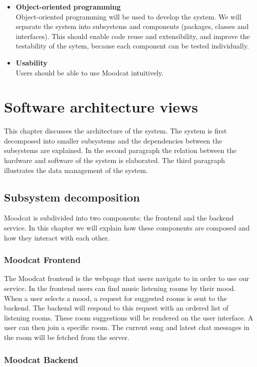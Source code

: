 \begin{itemize}
\item
\textbf{Object-oriented programming}
\\
Object-oriented programming\cite{Wirfs-Brock} will be used to develop the system.
We will separate the system into subsystems and components (packages, classes and interfaces).
This should enable code reuse and extensibility, and improve the testability of the sytem, because each component can be tested individually\cite{Binder}.

\item
\textbf{Usability}
\\
Users should be able to use Moodcat intuitively.

\end{itemize}

\chapter{Software architecture views}
This chapter discusses the architecture of the system.
The system is first decomposed into smaller subsystems and the dependencies between the subsystems are explained.
In the second paragraph the relation between the hardware and software of the system is elaborated.
The third paragraph illustrates the data management of the system.

\section{Subsystem decomposition}
Moodcat is subdivided into two components: the frontend and the backend service.
In this chapter we will explain how these components are composed and how they interact with each other.

\subsection{Moodcat Frontend}
The Moodcat frontend is the webpage that users navigate to in order to use our service.
In the frontend users can find music listening rooms by their mood.
When a user selects a mood, a request for suggested rooms is sent to the backend.
The backend will respond to this request with an ordered list of listening rooms.
These room suggestions will be rendered on the user interface.
A user can then join a specific room.
The current song and latest chat messages in the room will be fetched from the server.



\subsection{Moodcat Backend}
